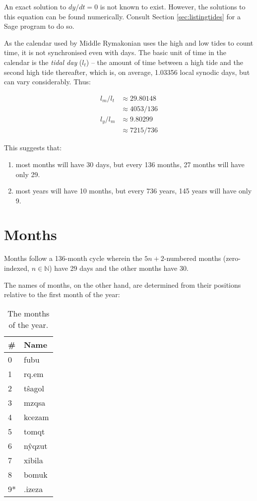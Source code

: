 \documentclass{book}
\newcommand{\lname}{Middle Rymakonian}
\begin{document}
An exact solution to $dy/dt = 0$ is not known to exist. However, the solutions to this equation can be found numerically. Consult Section \ref{sec:listingtides} for a Sage program to do so.

As the calendar used by \lname{} uses the high and low tides to count time, it is not synchronised even with days. The basic unit of time in the calendar is the \emph{tidal day}  ($l_t$) -- the amount of time between a high tide and the second high tide thereafter, which is, on average, 1.03356 local synodic days, but can vary considerably. Thus:

\begin{align}
    l_m / l_t &\approx 29.80148 \\
    &\approx 4053/136 \\
    l_y / l_m &\approx 9.80299 \\
    &\approx 7215/736
\end{align}

This suggests that:

\begin{enumerate}
    \item most months will have 30 days, but every 136 months, 27 months will have only 29.
    \item most years will have 10 months, but every 736 years, 145 years will have only 9.
\end{enumerate}

\section{Months}

Months follow a 136-month cycle wherein the $5n + 2$-numbered months (zero-indexed, $n \in \mathbb{N}$) have 29 days and the other months have 30.

The names of months, on the other hand, are determined from their positions relative to the first month of the year:

\begin{table}[ht]
    \caption{The months of the year.}
    \centering
    \begin{tabular}{|l|>{\kardinal}l|}
        \hline
        \# & \textnormal{Name} \\
        \hline
        0 & fubu \\
        1 & rq.em \\
        2 & t\^sagol \\
        3 & mzqsa \\
        4 & kcezam \\
        5 & tomqt \\
        6 & n\^yqzut \\
        7 & xibila \\
        8 & bomuk \\
        \hline
        9* & .izeza \\
        \hline
    \end{tabular}
\end{table}
\end{document}
